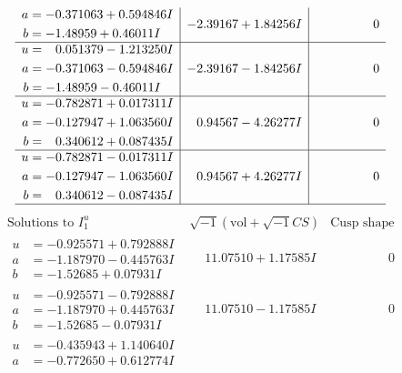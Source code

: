 \documentclass[1p]{elsarticle_modified}
\theoremstyle{definition}
\newcommand{\I}{\sqrt{-1}}
\begin{document}
$$\begin{array}{c|c|c}
\begin{aligned}
a &= -0.371063 + 0.594846 I \\
b &= -1.48959 + 0.46011 I\end{aligned}
 & -2.39167 + 1.84256 I & \phantom{-0.000000 } 0 \\ \hline\begin{aligned}
u &= \phantom{-}0.051379 - 1.213250 I \\
a &= -0.371063 - 0.594846 I \\
b &= -1.48959 - 0.46011 I\end{aligned}
 & -2.39167 - 1.84256 I & \phantom{-0.000000 } 0 \\ \hline\begin{aligned}
u &= -0.782871 + 0.017311 I \\
a &= -0.127947 + 1.063560 I \\
b &= \phantom{-}0.340612 + 0.087435 I\end{aligned}
 & \phantom{-}0.94567 - 4.26277 I & \phantom{-0.000000 } 0 \\ \hline\begin{aligned}
u &= -0.782871 - 0.017311 I \\
a &= -0.127947 - 1.063560 I \\
b &= \phantom{-}0.340612 - 0.087435 I\end{aligned}
 & \phantom{-}0.94567 + 4.26277 I & \phantom{-0.000000 } 0\\
 \hline 
 \end{array}$$\newpage$$\begin{array}{c|c|c}  
\text{Solutions to }I^u_{1}& \I (\text{vol} + \sqrt{-1}CS) & \text{Cusp shape}\\
 \hline 
\begin{aligned}
u &= -0.925571 + 0.792888 I \\
a &= -1.187970 - 0.445763 I \\
b &= -1.52685 + 0.07931 I\end{aligned}
 & \phantom{-}11.07510 + 1.17585 I & \phantom{-0.000000 } 0 \\ \hline\begin{aligned}
u &= -0.925571 - 0.792888 I \\
a &= -1.187970 + 0.445763 I \\
b &= -1.52685 - 0.07931 I\end{aligned}
 & \phantom{-}11.07510 - 1.17585 I & \phantom{-0.000000 } 0 \\ \hline\begin{aligned}
u &= -0.435943 + 1.140640 I \\
a &= -0.772650 + 0.612774 I \\

\end{aligned}
\end{array}$$
\end{document}
